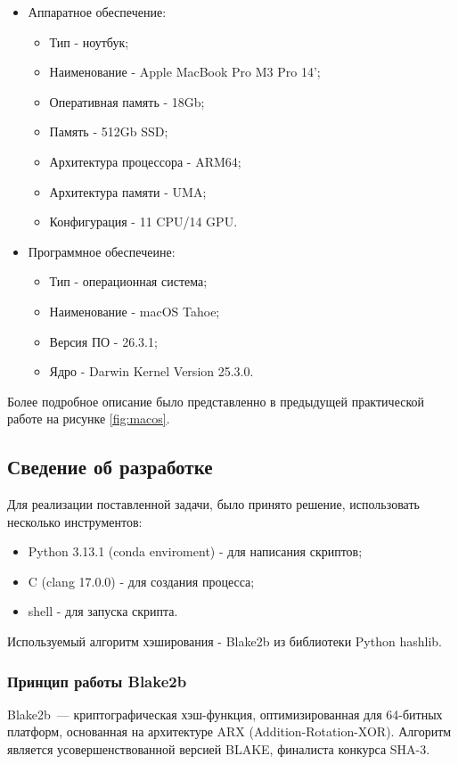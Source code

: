 \documentclass[areasetadvanced]{scrartcl}
\begin{document}
\begin{itemize}
    \item Аппаратное обеспечение: \begin{itemize}
        \item Тип - ноутбук;
        \item Наименование - Apple MacBook Pro M3 Pro 14'; 
        \item Оперативная память - 18Gb;
        \item Память - 512Gb SSD;
        \item Архитектура процессора - ARM64;
        \item Архитектура памяти - UMA;
        \item Конфигурация - 11 CPU/14 GPU.
        \end{itemize} 
    \item Программное обеспечеине: \begin{itemize}
        \item Тип - операционная система;
        \item Наименование - macOS Tahoe;
        \item Версия ПО - 26.3.1;
        \item Ядро - Darwin Kernel Version 25.3.0.
        \end{itemize}
\end{itemize}

Более подробное описание было представленно в предыдущей практической работе на рисунке \ref{fig:macos}.

\subsection{Сведение об разработке}

Для реализации поставленной задачи, было принято решение, использовать несколько инструментов:
\begin{itemize}
    \item Python 3.13.1 (conda enviroment) - для написания скриптов;
    \item C (clang 17.0.0) - для создания процесса;
    \item shell - для запуска скрипта.
\end{itemize}

Используемый алгоритм хэширования - Blake2b из библиотеки Python hashlib. 

\subsubsection{Принцип работы Blake2b}
Blake2b~--- криптографическая хэш-функция, оптимизированная для 64-битных платформ, основанная на архитектуре ARX (Addition-Rotation-XOR). Алгоритм является усовершенствованной версией BLAKE, финалиста конкурса SHA-3.
\end{document}
